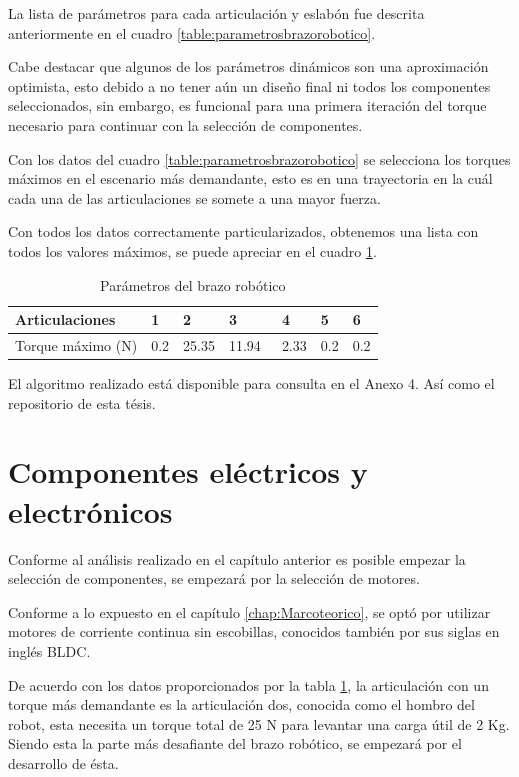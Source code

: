 La lista de parámetros para cada articulación y eslabón fue descrita anteriormente en el cuadro \ref{table:parametrosbrazorobotico}.

Cabe destacar que algunos de los parámetros dinámicos son una aproximación optimista, esto debido a no tener aún un diseño final ni todos los componentes seleccionados, sin embargo, es funcional para una primera iteración del torque necesario para continuar con la selección de componentes.

Con los datos del cuadro \ref{table:parametrosbrazorobotico} se selecciona los torques máximos en el escenario más demandante, esto es en una trayectoria en la cuál cada una de las articulaciones se somete a una mayor fuerza.

Con todos los datos correctamente particularizados, obtenemos una lista con todos los valores máximos, se puede apreciar en el cuadro \ref{table:maxtorque}. 

\begin{table}
\centering
\caption{Parámetros del brazo robótico}
\label{table:maxtorque}
\begin{tabular}{l|l|l|l|l|l|l|}
\textbf{Articulaciones}              &  1 & 2 & 3 &  4 &  5 &  6  \\ 
\hline
Torque máximo (N) & 0.2            & 25.35          & 11.94~         & 2.33           & 0.2            & 0.2            
\end{tabular}
\end{table}

El algoritmo realizado está disponible para consulta en el Anexo 4. Así como el repositorio de esta tésis.
       
\section{Componentes eléctricos y electrónicos}

Conforme al análisis realizado en el capítulo anterior es posible empezar la selección de componentes, se empezará por la selección de motores.

Conforme a lo expuesto en el capítulo \ref{chap:Marcoteorico}, se optó por utilizar motores de corriente continua sin escobillas, conocidos también por sus siglas en inglés BLDC.

De acuerdo con los datos proporcionados por la tabla \ref{table:maxtorque}, la articulación con un torque más demandante es la articulación dos, conocida como el hombro del robot, esta necesita un torque total de 25 N para levantar una carga útil de 2 Kg. Siendo esta la parte más desafiante del brazo robótico, se empezará por el desarrollo de ésta.

